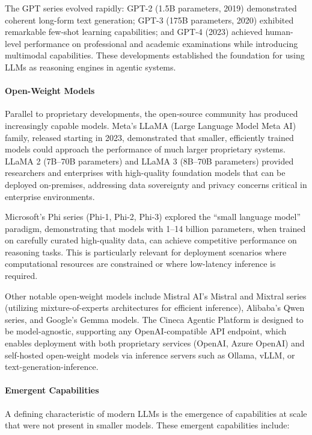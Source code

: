 The GPT series evolved rapidly: GPT-2 (1.5B parameters, 2019) demonstrated coherent long-form text generation; GPT-3 (175B parameters, 2020) exhibited remarkable few-shot learning capabilities; and GPT-4 (2023) achieved human-level performance on professional and academic examinations while introducing multimodal capabilities. These developments established the foundation for using LLMs as reasoning engines in agentic systems.

\paragraph{Open-Weight Models}
Parallel to proprietary developments, the open-source community has produced increasingly capable models. Meta's LLaMA (Large Language Model Meta AI) family, released starting in 2023, demonstrated that smaller, efficiently trained models could approach the performance of much larger proprietary systems. LLaMA 2 (7B--70B parameters) and LLaMA 3 (8B--70B parameters) provided researchers and enterprises with high-quality foundation models that can be deployed on-premises, addressing data sovereignty and privacy concerns critical in enterprise environments.

Microsoft's Phi series (Phi-1, Phi-2, Phi-3) explored the ``small language model'' paradigm, demonstrating that models with 1--14 billion parameters, when trained on carefully curated high-quality data, can achieve competitive performance on reasoning tasks. This is particularly relevant for deployment scenarios where computational resources are constrained or where low-latency inference is required.

Other notable open-weight models include Mistral AI's Mistral and Mixtral series (utilizing mixture-of-experts architectures for efficient inference), Alibaba's Qwen series, and Google's Gemma models. The Cineca Agentic Platform is designed to be model-agnostic, supporting any OpenAI-compatible API endpoint, which enables deployment with both proprietary services (OpenAI, Azure OpenAI) and self-hosted open-weight models via inference servers such as Ollama, vLLM, or text-generation-inference.

\paragraph{Emergent Capabilities}
A defining characteristic of modern LLMs is the emergence of capabilities at scale that were not present in smaller models. These emergent capabilities include:

